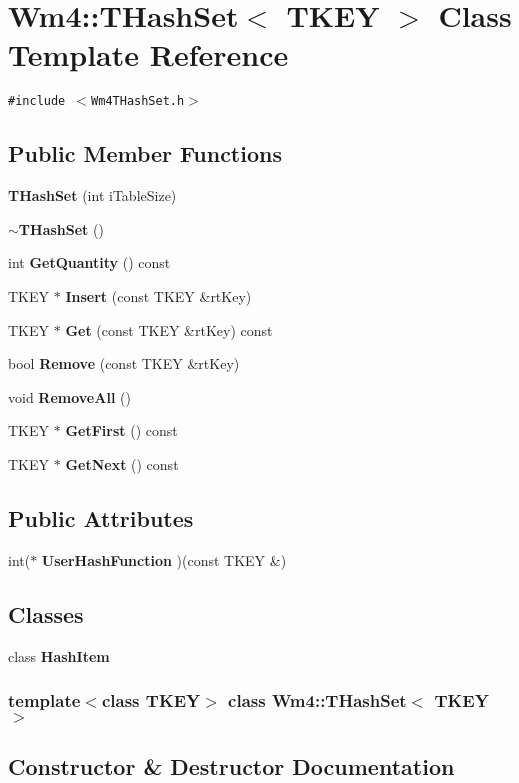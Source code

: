 \section{Wm4::THash\-Set$<$ TKEY $>$ Class Template Reference}
\label{classWm4_1_1THashSet}
{\tt \#include $<$Wm4THash\-Set.h$>$}

\subsection*{Public Member Functions}
\begin{CompactItemize}
\item 
{\bf THash\-Set} (int i\-Table\-Size)
\item 
{\bf $\sim$THash\-Set} ()
\item 
int {\bf Get\-Quantity} () const
\item 
TKEY $\ast$ {\bf Insert} (const TKEY \&rt\-Key)
\item 
TKEY $\ast$ {\bf Get} (const TKEY \&rt\-Key) const
\item 
bool {\bf Remove} (const TKEY \&rt\-Key)
\item 
void {\bf Remove\-All} ()
\item 
TKEY $\ast$ {\bf Get\-First} () const
\item 
TKEY $\ast$ {\bf Get\-Next} () const
\end{CompactItemize}
\subsection*{Public Attributes}
\begin{CompactItemize}
\item 
int($\ast$ {\bf User\-Hash\-Function} )(const TKEY \&)
\end{CompactItemize}
\subsection*{Classes}
\begin{CompactItemize}
\item 
class \textbf{Hash\-Item}
\end{CompactItemize}
\subsubsection*{template$<$class TKEY$>$ class Wm4::THash\-Set$<$ TKEY $>$}



\subsection{Constructor \& Destructor Documentation}
